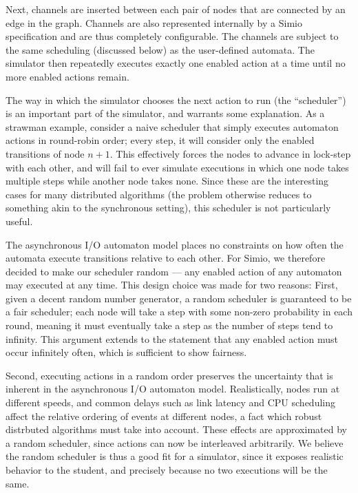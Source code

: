 \documentclass{scrartcl}
\begin{document}
Next, channels are inserted between each pair of nodes that are connected by an
edge in the graph. Channels are also represented internally by a Simio
specification and are thus completely configurable. The channels are subject to
the same scheduling (discussed below) as the user-defined automata. The
simulator then repeatedly executes exactly one enabled action at a time until
no more enabled actions remain.

The way in which the simulator chooses the next action to run (the
``scheduler'') is an important part of the simulator, and warrants some
explanation. As a strawman example, consider a naive scheduler that simply
executes automaton actions in round-robin order; every step, it will consider
only the enabled transitions of node $n+1$. This effectively forces the nodes
to advance in lock-step with each other, and will fail to ever simulate
executions in which one node takes multiple steps while another node takes
none. Since these are the interesting cases for many distributed algorithms
(the problem otherwise reduces to something akin to the synchronous setting),
this scheduler is not particularly useful.

The asynchronous I/O automaton model places no constraints on how often the
automata execute transitions relative to each other. For Simio, we therefore
decided to make our scheduler random --- any enabled action of any automaton
may executed at any time. This design choice was made for two reasons:
First, given a decent random number generator, a random scheduler is guaranteed
to be a fair scheduler; each node will take a step with some non-zero
probability in each round, meaning it must eventually take a step as the number
of steps tend to infinity. This argument extends to the statement that any
enabled action must occur infinitely often, which is sufficient to show
fairness.

Second, executing actions in a random order preserves the uncertainty that is
inherent in the asynchronous I/O automaton model. Realistically, nodes run at
different speeds, and common delays such as link latency and CPU scheduling
affect the relative ordering of events at different nodes, a fact which robust
distrbuted algorithms must take into account. These effects are approximated by
a random scheduler, since actions can now be interleaved arbitrarily. We
believe the random scheduler is thus a good fit for a simulator, since it
exposes realistic behavior to the student, and precisely because no two
executions will be the same.
\end{document}
